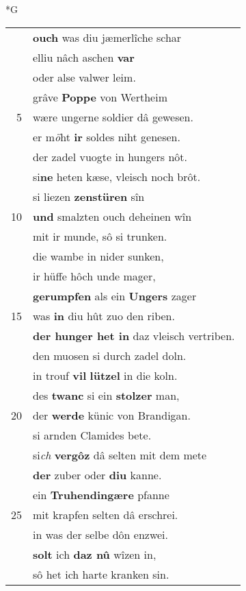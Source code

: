\documentclass[8pt,a4paper,notitlepage]{article}
\begin{document}
\newpage
\begin{table}[ht]
\begin{minipage}[t]{0.5\linewidth}
\small
\begin{center}*G
\end{center}
\begin{tabular}{rl}
 & \textbf{ouch} was diu jæmerlîche schar\\ 
 & elliu nâch aschen \textbf{var}\\ 
 & oder alse valwer leim.\\ 
 & grâve \textbf{Poppe} von Wertheim\\ 
5 & wære ungerne soldier dâ gewesen.\\ 
 & er m\textit{ö}ht \textbf{ir} soldes niht genesen.\\ 
 & der zadel vuogte in hungers nôt.\\ 
 & si\textbf{ne} heten kæse, vleisch noch brôt.\\ 
 & si liezen \textbf{zenstüren} sîn\\ 
10 & \textbf{und} smalzten ouch deheinen wîn\\ 
 & mit ir munde, sô si trunken.\\ 
 & die wambe in nider sunken,\\ 
 & ir hüffe hôch unde mager,\\ 
 & \textbf{gerumpfen} als ein \textbf{Ungers} zager\\ 
15 & was \textbf{in} diu hût zuo den riben.\\ 
 & \textbf{der hunger het in} daz vleisch vertriben.\\ 
 & den muosen si durch zadel doln.\\ 
 & in trouf \textbf{vil} \textbf{lützel} in die koln.\\ 
 & des \textbf{twanc} si ein \textbf{stolzer} man,\\ 
20 & der \textbf{werde} künic von Brandigan.\\ 
 & si arnden Clamides bete.\\ 
 & si\textit{ch} \textbf{vergôz} dâ selten mit dem mete\\ 
 & \textbf{der} zuber oder \textbf{diu} kanne.\\ 
 & ein \textbf{Truhendingære} pfanne\\ 
25 & mit krapfen selten dâ erschrei.\\ 
 & in was der selbe dôn enzwei.\\ 
 & \textbf{solt} ich \textbf{daz nû} wîzen in,\\ 
 & sô het ich harte kranken sin.\\ 

\end{tabular}
\end{minipage}
\end{table}
\end{document}
